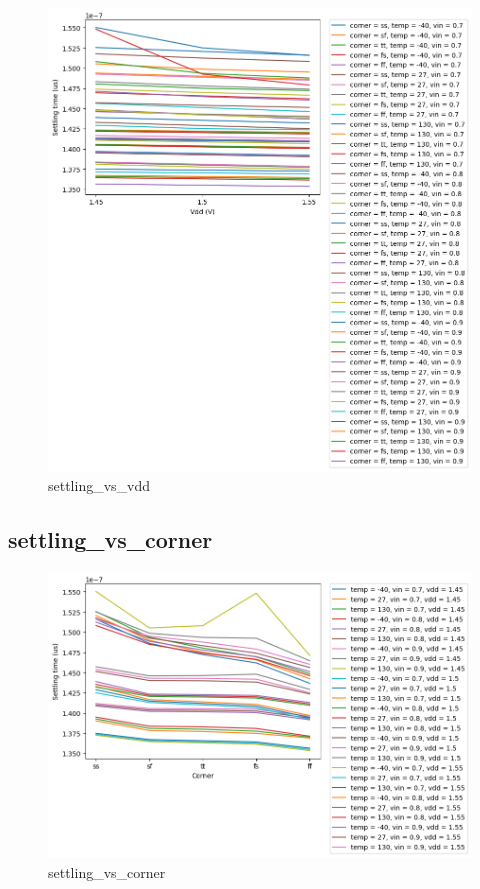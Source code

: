 \documentclass[
  a4paper,
  DIV=11,
  numbers=noendperiod]{scrartcl}
\begin{document}
\begin{tcolorbox}
\begin{figure}[H]
{\centering \includegraphics{./cace/_docs/ota-5t/schematic/settling_vs_vdd.png}

}

\caption{settling\_vs\_vdd}

\end{figure}%

\subsection*{settling\_vs\_corner}\label{settling_vs_corner}

\begin{figure}[H]

{\centering \includegraphics{./cace/_docs/ota-5t/schematic/settling_vs_corner.png}

}

\caption{settling\_vs\_corner}

\end{figure}%

\end{tcolorbox}
\end{document}
